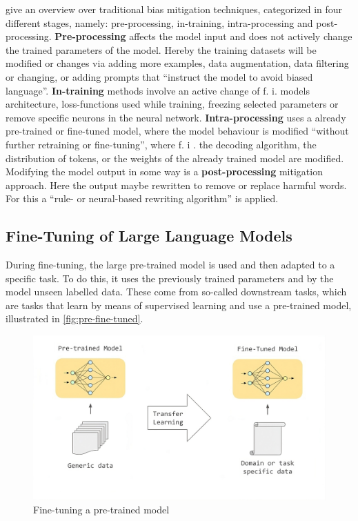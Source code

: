 \citet{biassurvey} give an overview over traditional bias mitigation techniques, categorized in four different stages, namely: pre-processing, in-training, intra-processing and post-processing.  
\textbf{Pre-processing} affects the model input and does not actively change the trained parameters of the model. Hereby the training datasets will be modified or changes via adding more examples, data augmentation, data filtering or changing, or adding prompts that \enquote{instruct the model to avoid biased language}.
\textbf{In-training} methods involve an active change of f. i. models architecture, loss-functions used while training, freezing selected parameters or remove specific neurons in the neural network. 
\textbf{Intra-processing} uses a already pre-trained or fine-tuned model, where the model behaviour is modified \enquote{without further retraining or fine-tuning}, where f. i . the decoding algorithm,  the distribution of tokens, or the weights of the already trained model are modified.
Modifying the model output in some way is a \textbf{post-processing} mitigation approach. Here the output maybe rewritten to remove or replace harmful words. For this a \enquote{rule- or neural-based rewriting algorithm} is applied.


\subsection{Fine-Tuning of Large Language Models}
\label{subsec:fine-tuning}
During fine-tuning, the large pre-trained model is used and then adapted to a specific task. To do this, it uses the previously trained parameters and by the model unseen labelled data. These come from so-called downstream tasks, which are tasks that learn by means of supervised learning and use a pre-trained model, illustrated in \autoref{fig:pre-fine-tuned}.

\begin{figure}[h]
    \centering
    \includegraphics[width=\textwidth]{bhtThesis/main/2Background/images/fine-tuning-pretrained.png}
    \caption{Fine-tuning a pre-trained model \citep{fine-tuning-pretrained}}
    \label{fig:pre-fine-tuned}
\end{figure}


